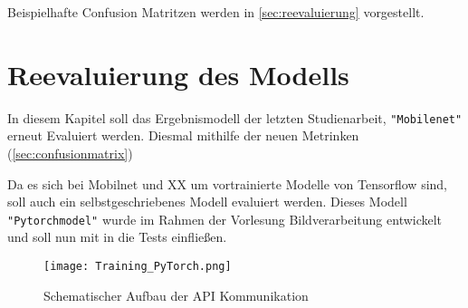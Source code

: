 Beispielhafte Confusion Matritzen werden in \autoref{sec:reevaluierung} vorgestellt.

\section{Reevaluierung des Modells} \label{sec:reevaluierung}

In diesem Kapitel soll das Ergebnismodell der letzten Studienarbeit, \texttt{"Mobilenet"} erneut Evaluiert werden. Diesmal mithilfe der neuen Metrinken (\autoref{sec:confusionmatrix})

Da es sich bei Mobilnet und XX um vortrainierte Modelle von Tensorflow sind, soll auch ein selbstgeschriebenes Modell evaluiert werden. Dieses Modell \texttt{"Pytorchmodel"} wurde im Rahmen der Vorlesung Bildverarbeitung entwickelt und soll nun mit in die Tests einfließen. 

\begin{figure}[h]
    \centering
    \texttt{[image: Training\_PyTorch.png]}
    \caption{Schematischer Aufbau der API Kommunikation}
    \label{fig:Training_PyTorch}
\end{figure}